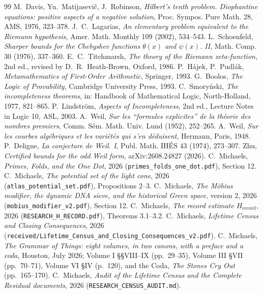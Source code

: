 \documentclass[11pt]{article}
\theoremstyle{definition}
\theoremstyle{remark}
\begin{document}
\begin{thebibliography}{99}
 M.~Davis, Yu.~Matijasevi\v{c}, J.~Robinson, \emph{Hilbert's tenth problem. Diophantine equations: positive aspects of a negative solution}, Proc. Sympos. Pure Math. 28, AMS, 1976, 323--378.
 J.~C.~Lagarias, \emph{An elementary problem equivalent to the Riemann hypothesis}, Amer. Math. Monthly 109 (2002), 534--543.
 L.~Schoenfeld, \emph{Sharper bounds for the Chebyshev functions $\theta(x)$ and $\psi(x)$. II}, Math. Comp. 30 (1976), 337--360.
 E.~C.~Titchmarsh, \emph{The theory of the Riemann zeta-function}, 2nd ed., revised by D.~R.~Heath-Brown, Oxford, 1986.
 P.~H\'ajek, P.~Pudl\'ak, \emph{Metamathematics of First-Order Arithmetic}, Springer, 1993.
 G.~Boolos, \emph{The Logic of Provability}, Cambridge University Press, 1993.
 C.~Smory\'nski, \emph{The incompleteness theorems}, in: Handbook of Mathematical Logic, North-Holland, 1977, 821--865.
 P.~Lindstr\"om, \emph{Aspects of Incompleteness}, 2nd ed., Lecture Notes in Logic 10, ASL, 2003.
 A.~Weil, \emph{Sur les ``formules explicites'' de la th\'eorie des nombres premiers}, Comm. S\'em. Math. Univ. Lund (1952), 252--265.
 A.~Weil, \emph{Sur les courbes alg\'ebriques et les vari\'et\'es qui s'en d\'eduisent}, Hermann, Paris, 1948.
 P.~Deligne, \emph{La conjecture de Weil. I}, Publ. Math. IH\'ES 43 (1974), 273--307.
 Zhu, \emph{Certified bounds for the odd Weil form}, arXiv:2608.24827 (2026).
 C.~Michaels, \emph{Primes, Folds, and the One Dot}, 2026 (\texttt{primes\_folds\_one\_dot.pdf}), Section 12.
 C.~Michaels, \emph{The potential set of the light cone}, 2026 (\texttt{atlas\_potential\_set.pdf}), Propositions 2--3.
 C.~Michaels, \emph{The M\"obius modifier, the dynamic DNA sieve, and the historical Green space}, version 2, 2026 (\texttt{mobius\_modifier\_v2.pdf}), Section 12.
 C.~Michaels, \emph{The record estimate $H_{\mathrm{record}}$}, 2026 (\texttt{RESEARCH\_H\_RECORD.pdf}), Theorems 3.1--3.2.
 C.~Michaels, \emph{Lifetime Census and Closing Consequences}, 2026 (\texttt{received/Lifetime\_Census\_and\_Closing\_Consequences\_v2.pdf}).
 C.~Michaels, \emph{The Grammar of Things: eight volumes, in two canons, with a preface and a coda}, Houston, July 2026; Volume I \S\S VIII--IX (pp.~29--35), Volume III \S VII (pp.~70--71), Volume VI \S IV (p.~120), and the Coda, \emph{The Stones Cry Out} (pp.~165--170).
 C.~Michaels, \emph{Audit of the Lifetime Census and the Complete Residual documents}, 2026 (\texttt{RESEARCH\_CENSUS\_AUDIT.md}).
\end{thebibliography}
\end{document}
